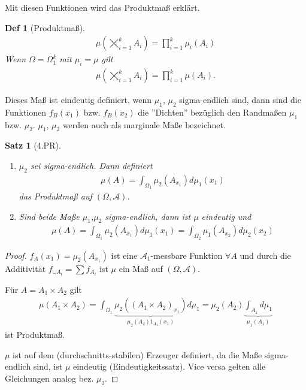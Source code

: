 \documentclass[]{article}
\newtheorem{theorem}{Satz}
\newtheorem*{definition*}{Def}
\begin{document}
Mit diesen Funktionen wird das Produktmaß erklärt.
\begin{definition*}[Produktmaß]
	\begin{align*}
		\mu\left(\bigtimes_{i=1}^k A_i\right) = \prod_{i=1}^{k}\mu_i(A_i)
	\end{align*}
	Wenn $\Omega = \Omega_1^k$ mit $\mu_i = \mu$ gilt
	\begin{align*}
		\mu\left(\bigtimes_{i=1}^k A_i\right) = \prod_{i=1}^{k}\mu(A_i).
	\end{align*}
\end{definition*}

Dieses Maß ist eindeutig definiert, wenn $\mu_1$, $\mu_2$ sigma-endlich sind, dann sind die Funktionen $f_B(x_1)$ bzw. $f_B(x_2)$ die ''Dichten'' bezüglich den Randmaßen $\mu_1$ bzw. $\mu_2$. $\mu_1$, $\mu_2$ werden auch als marginale Maße bezeichnet.

\begin{theorem}[4.PR]
	\begin{enumerate}
		\item $\mu_2$ sei sigma-endlich. Dann definiert
		\begin{align*}
			\mu(A) = \int_{\Omega_1}\mu_2(A_{x_1})d\mu_1(x_1)
		\end{align*}
		das Produktmaß auf $(\Omega, \mathcal{A})$.
		
		\item Sind beide Maße $\mu_1$,$\mu_2$ sigma-endlich, dann ist $\mu$ eindeutig und
		\begin{align*}
			\mu(A) = \int_{\Omega_1}\mu_2(A_{x_1})d\mu_1(x_1) = \int_{\Omega_2}\mu_1(A_{x_2})d\mu_2(x_2)
		\end{align*}
	\end{enumerate}
\end{theorem}
\begin{proof}
	$f_A(x_1)=\mu_2(A_{x_1})$ ist eine $\mathcal{A}_1$-messbare Funktion $\forall A$ und durch die Additivität $f_{\cup A_i} = \sum f_{A_i}$ ist $\mu$ ein Maß auf $(\Omega, \mathcal{A})$.
	
	Für $A=A_1\times A_2$ gilt
	\begin{align*}
		\mu(A_1\times A_2) = \int_{\Omega_1} \underbrace{\mu_2((A_1\times A_2)_{x_1})}_{\mu_2(A_2) 1_{A_1}(x_1)} d\mu_1 = \mu_2(A_2) \underbrace{\int_{A_1} d\mu_1}_{\mu_1(A_1)}
	\end{align*}
	ist Produktmaß.
	
	$\mu$ ist auf dem (durchschnitts-stabilen) Erzeuger definiert, da die Maße sigma-endlich sind, ist $\mu$ eindeutig (Eindeutigkeitssatz). Vice versa gelten alle Gleichungen analog bez. $\mu_2$.
\end{proof}
\end{document}
